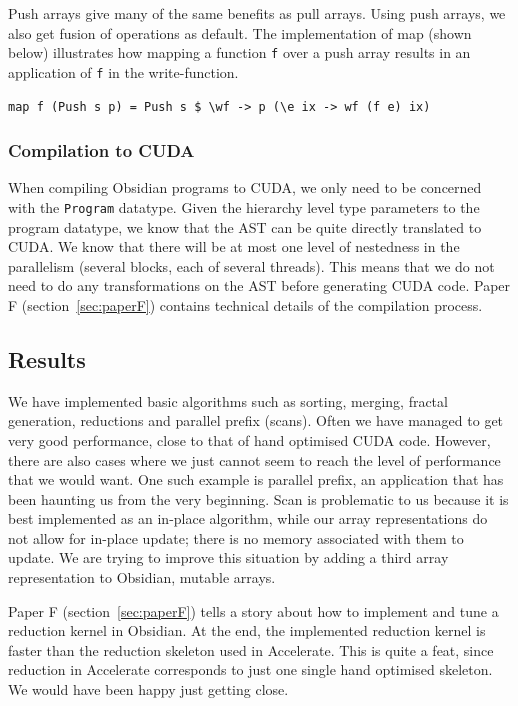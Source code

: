 \documentclass[a4paper]{book}
\begin{document}
Push arrays give many of the same benefits as pull arrays. Using push 
arrays, we also get fusion of operations as default. The implementation of map 
(shown below) illustrates how mapping a function {\tt f} over a push array results 
in an application of {\tt f} in the write-function. 

\begin{verbatim} 
map f (Push s p) = Push s $ \wf -> p (\e ix -> wf (f e) ix)
\end{verbatim}

\subsubsection{Compilation to CUDA}

When compiling Obsidian programs to CUDA, we only need to be concerned with the 
{\tt Program} datatype. Given the hierarchy level type parameters to the program datatype, 
we know that the AST can be quite directly translated to CUDA. We know that there will 
be at most one level of nestedness in the parallelism (several blocks, each of several threads). 
This means that we do not need to do any transformations on the AST before generating CUDA code. 
Paper F (section~\ref{sec:paperF}) contains technical details of the compilation process. 

\subsection{Results}
\FloatBarrier 

We have implemented basic algorithms such as sorting, merging, fractal generation, reductions 
and parallel prefix (scans). Often we have managed to get very good performance, close to that 
of hand optimised CUDA code. However, there are also cases where we just cannot seem to reach 
the level of performance that we would want. One such example is parallel prefix, an 
application that has been haunting us from the very beginning. Scan is problematic to us because 
it is best implemented as an in-place algorithm, while our array representations do 
not allow for in-place update; there is no memory associated with them to update. 
We are trying to improve this situation by adding a third array representation to Obsidian,
mutable arrays.   

Paper F (section~\ref{sec:paperF}) tells a story about how to implement and tune 
a reduction kernel in Obsidian. At the end, the implemented reduction kernel is  
faster than the reduction skeleton used in Accelerate. This is quite a feat, since 
reduction in Accelerate corresponds to just one single hand optimised skeleton. We would have 
been happy just getting close.   
\end{document}

